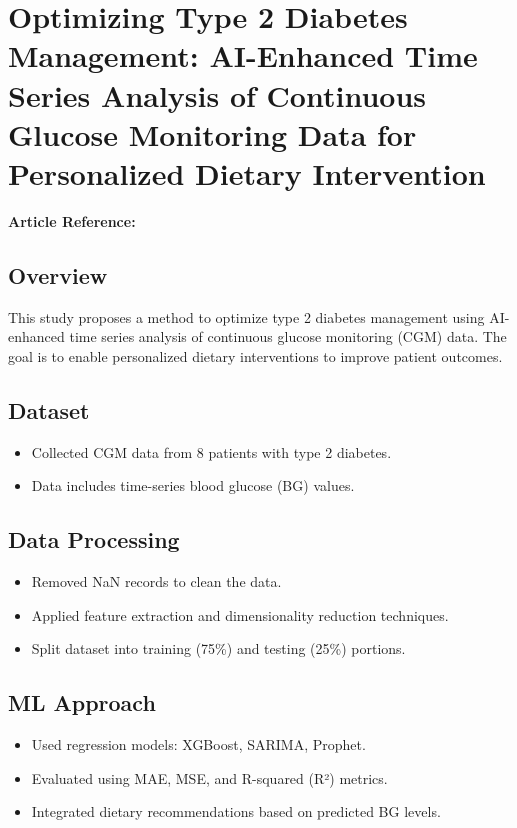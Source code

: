 \section{Optimizing Type 2 Diabetes Management: AI-Enhanced Time Series Analysis of Continuous Glucose Monitoring Data for Personalized Dietary Intervention}
\textbf{Article Reference:} \cite{article_9}

\subsection*{Overview}
This study proposes a method to optimize type 2 diabetes management using AI-enhanced time series analysis of continuous glucose monitoring (CGM) data. The goal is to enable personalized dietary interventions to improve patient outcomes.

\subsection*{Dataset}
\begin{itemize}
    \item Collected CGM data from 8 patients with type 2 diabetes.
    \item Data includes time-series blood glucose (BG) values.
\end{itemize}

\subsection*{Data Processing}
\begin{itemize}
    \item Removed NaN records to clean the data.
    \item Applied feature extraction and dimensionality reduction techniques.
    \item Split dataset into training (75\%) and testing (25\%) portions.
\end{itemize}

\subsection*{ML Approach}
\begin{itemize}
    \item Used regression models: XGBoost, SARIMA, Prophet.
    \item Evaluated using MAE, MSE, and R-squared (R²) metrics.
    \item Integrated dietary recommendations based on predicted BG levels.
\end{itemize}

